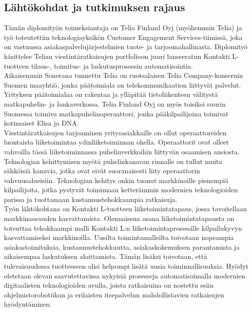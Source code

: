 \documentclass[finnish,12pt,a4paper,pdftex]{article}
\begin{document}
\subsection{Lähtökohdat ja tutkimuksen rajaus}

Tämän diplomityön toimeksiantaja on Telia Finland Oyj (myöhemmin Telia) ja työ toteutettiin teknologiayksikön Customer Engagement Services-tiimissä, joka on vastuussa asiakaspalvelujärjestelmien tuote- ja tarjoomahallinasta. Diplomityö käsittelee Telian viestintäratkaisujen portfolioon juuri lanseeratun Kontakti L-tuotteen tilaus-, toimitus- ja laskutusprosessin automatisointia.\\

\noindent Aikaisemmin Sonerana tunnettu Telia on ruotsalaisen Telia Company-konsernin Suomen maayhtiö, jonka päätoimiala on telekommunikaation liittyvät palvelut. Yrityksen päätoimialaa on rakentaa ja ylläpitää tietoliikenteen välitystä matkapuhelin- ja lankaverkossa. Telia Finland Oyj on myös toisiksi suurin Suomessa toimiva matkapuhelinoperaattori, jonka pääkilpailijoina toimivat kotimaiset Elisa ja DNA.\\

\noindent Viestintäratkaisujen tarjoaminen yritysasiakkaille on ollut operaattoreiden luontaista liiketoimintaa ydinliiketoiminnan ohella. Operaattorit ovat olleet vahvoilla tässä liiketoiminnassa puhelinverkkoihin liittyvän osaamisen ansiosta. Teknologian kehittymisen myötä puhelinkanavan rinnalle on tullut muita sähköisiä kanavia, jotka ovat eivät suoranaisesti liity operaattorin vahvuusalueisiin. Teknologian kehitys onkin tuonut markkinoille pienempiä kilpailijoita, jotka pystyvät toimimaan ketterämmin modernien teknologioiden parissa ja tuottamaan kustannustehokkaampia ratkaisuja.\\

Työn lähtökohtana on Kontakti L-tuotteen liiketoimintatapaus, jossa tavoitellaan markkinaosuuden kasvattamista. Olennaisena osana liiketoimintatapausta on toteuttaa tehokkaampi malli Kontakti L:n liiketoimintaprosessille kilpailukyvyn kasvattamiseksi markkinoilla. Uusilta toimintamalleilta toivotaan nopeampia asiakastoimituksia, kustannustehokkuutta, asiakaskokemuksen parantamista ja aikaisempaa laskutuksen aloittamista. Tämän lisäksi toivotaan, että tulevaisuudessa tuotteeseen olisi helpompi lisätä uusia toiminnallisuuksia. Hyödyt oletetaan olevan saavutettavissa nykyisiä prosesseja automatisoimalla modernien digitaalisten teknologioiden avulla, joista ratkaisuina on nostettu esiin ohjelmistorobotiikan ja erilaisten itsepalvelun mahdollistavien ratkaisujen hyödyntäminen.\\
\end{document}
